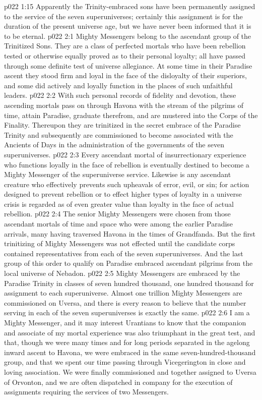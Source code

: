 \vs p022 1:15 Apparently the Trinity\hyp{}embraced sons have been permanently assigned to the service of the seven superuniverses; certainly this assignment is for the duration of the present universe age, but we have never been informed that it is to be eternal.
\vs p022 2:1 Mighty Messengers belong to the ascendant group of the Trinitized Sons. They are a class of perfected mortals who have been rebellion tested or otherwise equally proved as to their personal loyalty; all have passed through some definite test of universe allegiance. At some time in their Paradise ascent they stood firm and loyal in the face of the disloyalty of their superiors, and some did actively and loyally function in the places of such unfaithful leaders.
\vs p022 2:2 With such personal records of fidelity and devotion, these ascending mortals pass on through Havona with the stream of the pilgrims of time, attain Paradise, graduate therefrom, and are mustered into the Corps of the Finality. Thereupon they are trinitized in the secret embrace of the Paradise Trinity and subsequently are commissioned to become associated with the Ancients of Days in the administration of the governments of the seven superuniverses.
\vs p022 2:3 Every ascendant mortal of insurrectionary experience who functions loyally in the face of rebellion is eventually destined to become a Mighty Messenger of the superuniverse service. Likewise is any ascendant creature who effectively prevents such upheavals of error, evil, or sin; for action designed to prevent rebellion or to effect higher types of loyalty in a universe crisis is regarded as of even greater value than loyalty in the face of actual rebellion.
\vs p022 2:4 The senior Mighty Messengers were chosen from those ascendant mortals of time and space who were among the earlier Paradise arrivals, many having traversed Havona in the times of Grandfanda. But the first trinitizing of Mighty Messengers was not effected until the candidate corps contained representatives from each of the seven superuniverses. And the last group of this order to qualify on Paradise embraced ascendant pilgrims from the local universe of Nebadon.
\vs p022 2:5 Mighty Messengers are embraced by the Paradise Trinity in classes of seven hundred thousand, one hundred thousand for assignment to each superuniverse. Almost one trillion Mighty Messengers are commissioned on Uversa, and there is every reason to believe that the number serving in each of the seven superuniverses is exactly the same.
\pc \vs p022 2:6 I am a Mighty Messenger, and it may interest Urantians to know that the companion and associate of my mortal experience was also triumphant in the great test, and that, though we were many times and for long periods separated in the agelong inward ascent to Havona, we were embraced in the same seven\hyp{}hundred\hyp{}thousand group, and that we spent our time passing through Vicegerington in close and loving association. We were finally commissioned and together assigned to Uversa of Orvonton, and we are often dispatched in company for the execution of assignments requiring the services of two Messengers.
